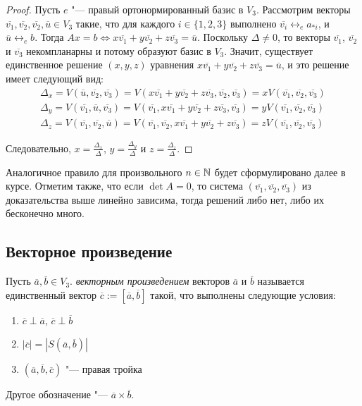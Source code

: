 \begin{proof}
	Пусть $e$ "--- правый ортонормированный базис в $V_3$. Рассмотрим векторы $\overline{v_1}, \overline{v_2}, \overline{v_2}, \overline{u} \in V_3$ такие, что для каждого $i \in \{1, 2, 3\}$ выполнено $\overline{v_i} \leftrightarrow_{e} a_{*i}$, и $\overline{u} \leftrightarrow_{e} b$. Тогда $Ax = b \Leftrightarrow x\overline{v_1} + y\overline{v_2} + z\overline{v_3} = \overline{u}$. Поскольку $\Delta \ne 0$, то векторы $\overline{v_1}$, $\overline{v_2}$ и $\overline{v_3}$ некомпланарны и потому образуют базис в $V_3$. Значит, существует единственное решение $(x, y, z)$ уравнения $x\overline{v_1} + y\overline{v_2} + z\overline{v_3} = \overline{u}$, и это решение имеет следующий вид:
	\begin{gather*}
	\Delta_x = V(\overline{u}, \overline{v_2}, \overline{v_3}) = V(x\overline{v_1} + y\overline{v_2} + z\overline{v_3}, \overline{v_2}, \overline{v_3}) = xV(\overline{v_1}, \overline{v_2}, \overline{v_3})\\
	\Delta_y = V(\overline{v_1}, \overline{u}, \overline{v_3}) = V(\overline{v_1}, x\overline{v_1} + y\overline{v_2} + z\overline{v_3}, \overline{v_3}) = yV(\overline{v_1}, \overline{v_2}, \overline{v_3})\\
	\Delta_z = V(\overline{v_1}, \overline{v_2}, \overline{u}) = V(\overline{v_1}, \overline{v_2}, x\overline{v_1} + y\overline{v_2} + z\overline{v_3}) = zV(\overline{v_1}, \overline{v_2}, \overline{v_3})
	\end{gather*}
	
	Следовательно, $x = \frac{\Delta_x}{\Delta}$, $y = \frac{\Delta_y}{\Delta}$ и $z = \frac{\Delta_z}{\Delta}$.
\end{proof}

\begin{note}
	Аналогичное правило для произвольного $n \in \mathbb{N}$ будет сформулировано далее в курсе. Отметим также, что если $\det{A} = 0$, то система $(\overline{v_1}, \overline{v_2}, \overline{v_3})$ из доказательства выше линейно зависима, тогда решений либо нет, либо их бесконечно много.
\end{note}

\subsection{Векторное произведение}

\begin{definition}
	Пусть $\overline{a}, \overline{b} \in V_3$. \textit{векторным произведением} векторов $\overline{a}$ и $\overline{b}$ называется единственный вектор $\overline{c} := [\overline{a}, \overline{b}]$ такой, что выполнены следующие условия:
	\begin{enumerate}
		\item $\overline{c} \perp \overline{a}$, $\overline{c} \perp \overline{b}$
		\item $|\overline{c}| = |S(\overline{a}, \overline{b})|$
		\item $(\overline{a}, \overline{b}, \overline{c})$ "--- правая тройка
	\end{enumerate}
	
	Другое обозначение "--- $\overline{a} \times \overline{b}$.
\end{definition}

